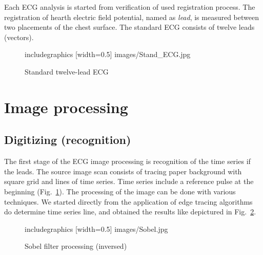 \documentclass[runningheads]{AIIT}
\begin{document}
Each ECG analysis is started from verification of used registration process.  The registration of hearth electric field potential, named as \emph{lead}, is measured between two placements of the chest surface.  The standard ECG consists of twelve leads (vectors).

\begin{figure}[htb]
  \centering
    includegraphics [width=0.5\linewidth] {images/Stand_ECG.jpg}
  \caption{Standard twelve-lead ECG}
  \label{fig:leads-ex}
\end{figure}

\section{Image processing}
\label{sec:image-processing}

\subsection{Digitizing (recognition)}
\label{sec:digit-recogn}

The first stage of the ECG image processing is recognition of the time series if the leads.  The source image scan consists of tracing paper background with square grid and lines of time series.  Time series include a reference pulse at the beginning (Fig.~\ref{fig:leads-ex}).  The processing of the image can be done with various techniques.  We started directly from the application of edge tracing algorithms do determine time series line, and obtained the results like depictured in Fig.~\ref{fig:sobel-ex}.

\begin{figure}[htb]
  \centering
    includegraphics [width=0.5\linewidth] {images/Sobel.jpg}
  \caption{Sobel filter processing (inversed)}
  \label{fig:sobel-ex}
\end{figure}
\end{document}
